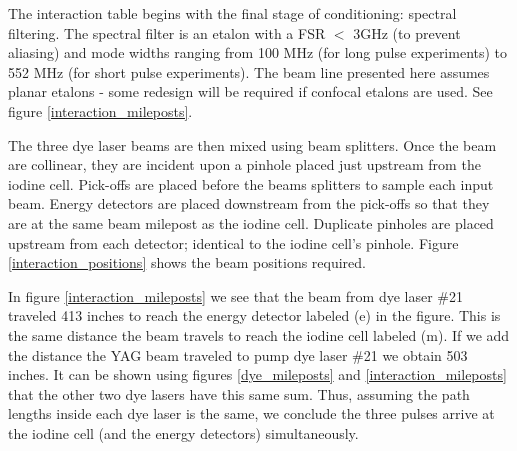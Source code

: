 The interaction table begins with the final stage of conditioning: spectral filtering. The spectral filter is an etalon with a FSR $<$ 3GHz (to prevent aliasing) and mode widths ranging from 100 MHz (for long pulse experiments) to 552 MHz (for short pulse experiments). The beam line presented here assumes planar etalons - some redesign will be required if confocal etalons are used. See figure \ref{interaction_mileposts}.


The three dye laser beams are then mixed using beam splitters. Once the beam are collinear, they are incident upon a pinhole placed just upstream from the iodine cell. Pick-offs are placed before the beams splitters to sample each input beam. Energy detectors are placed downstream from the pick-offs so that they are at the same beam milepost as the iodine cell. Duplicate pinholes are placed upstream from each detector; identical to the iodine cell's pinhole. Figure \ref{interaction_positions} shows the beam positions required.



In figure \ref{interaction_mileposts} we see that the beam from dye laser \#21 traveled 413 inches to reach the energy detector labeled (e) in the figure. This is the same distance the beam travels to reach the iodine cell labeled (m). If we add the distance the YAG beam traveled to pump dye laser \#21 we obtain 503 inches. It can be shown using figures \ref{dye_mileposts} and \ref{interaction_mileposts} that the other two dye lasers have this same sum. Thus, assuming the path lengths inside each dye laser is the same, we conclude the three pulses arrive at the iodine cell (and the energy detectors) simultaneously.

